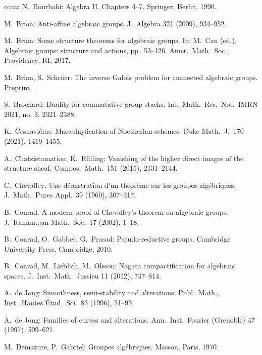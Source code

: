 \documentclass[oneside, 12pt]{amsart}
\theoremstyle{definition}
\theoremstyle{remark}
\begin{document}
\begin{thebibliography}{ccccc}
N.\ Bourbaki:
Algebra II. Chapters 4--7.
Springer, Berlin, 1990.

M.\ Brion:
Anti-affine algebraic groups. 
J.\ Algebra 321 (2009),  934--952. 

M.\ Brion:
Some structure theorems for algebraic groups.
In:
M.\ Can (ed.),  Algebraic groups: structure and actions, pp.\ 53--126.
Amer.\ Math.\ Soc., Providence, RI, 2017. 

M.\ Brion, S.\ Schr\"oer:
The inverse Galois problem for connected algebraic groups.
Preprint, .

S.\ Brochard:
Duality for commutative group stacks. 
Int.\ Math.\ Res.\ Not.\ IMRN 2021, no. 3, 2321–2388.

K.\ \v{C}esnavi\v{c}ius:
Macaulayfication of Noetherian schemes.
Duke Math.\ J.\ 170 (2021), 1419--1455. 

A.\ Chatzistamatiou, K.\ Rülling:
Vanishing of the higher direct images of the structure sheaf. 
Compos.\ Math.\ 151 (2015),  2131--2144. 

C.\ Chevalley:
Une d\'eonstration d'un th\'eor\`eme sur les groupes alg\'ebriques.  
J.\ Math.\ Pures Appl.\ 39 (1960), 307--317. 

B.\ Conrad:
A modern proof of Chevalley's theorem on algebraic groups. 
J.\ Ramanujan Math.\ Soc.\ 17 (2002),  1--18. 
% 

B.\ Conrad, O.\ Gabber, G.\ Prasad:
Pseudo-reductive groups. 
Cambridge University Press, Cambridge, 2010.

B.\  Conrad, M.\  Lieblich, M.\  Olsson:
Nagata compactification for algebraic spaces.  
J.\ Inst.\ Math.\ Jussieu 11 (2012),   747--814.

A.\ de Jong:
Smoothness, semi-stability and alterations.
Publ.\ Math., Inst.\ Hautes \'Etud.\ Sci.\  83 (1996), 51--93.

A.\ de Jong:
Families of curves and alterations. 
Ann.\ Inst.\ Fourier (Grenoble) 47 (1997), 599--621. 

M.\ Demazure, P.\ Gabriel:
Groupes alg\'ebriques.
Masson, Paris, 1970.


\end{thebibliography}
\end{document}

